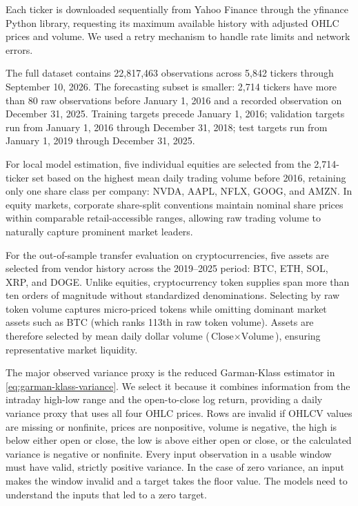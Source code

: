 \documentclass[12pt,a4paper]{article}
\numberwithin{equation}{section}
\numberwithin{table}{section}
\numberwithin{figure}{section}
\begin{document}
Each ticker is downloaded sequentially from Yahoo Finance through the yfinance Python library, requesting its maximum available history with adjusted OHLC prices and volume. We used a retry mechanism to handle rate limits and network errors. 

The full dataset contains 22,817,463 observations across 5,842 tickers through September 10, 2026. The forecasting subset is smaller: 2,714 tickers have more than 80 raw observations before January 1, 2016 and a recorded observation on December 31, 2025. Training targets precede January 1, 2016; validation targets run from January 1, 2016 through December 31, 2018; test targets run from January 1, 2019 through December 31, 2025. 

For local model estimation, five individual equities are selected from the 2,714-ticker set based on the highest mean daily trading volume before 2016, retaining only one share class per company: NVDA, AAPL, NFLX, GOOG, and AMZN. In equity markets, corporate share-split conventions maintain nominal share prices within comparable retail-accessible ranges, allowing raw trading volume to naturally capture prominent market leaders.

For the out-of-sample transfer evaluation on cryptocurrencies, five assets are selected from vendor history across the 2019--2025 period: BTC, ETH, SOL, XRP, and DOGE. Unlike equities, cryptocurrency token supplies span more than ten orders of magnitude without standardized denominations. Selecting by raw token volume captures micro-priced tokens while omitting dominant market assets such as BTC (which ranks 113th in raw token volume). Assets are therefore selected by mean daily dollar volume ($\text{Close}\times\text{Volume}$), ensuring representative market liquidity. 

The major observed variance proxy is the reduced Garman-Klass estimator in \eqref{eq:garman-klass-variance}. We select it because it combines information from the intraday high-low range and the open-to-close log return, providing a daily variance proxy that uses all four OHLC prices. Rows are invalid if OHLCV values are missing or nonfinite, prices are nonpositive, volume is negative, the high is below either open or close, the low is above either open or close, or the calculated variance is negative or nonfinite. Every input observation in a usable window must have valid, strictly positive variance. In the case of zero variance, an input makes the window invalid and a target takes the floor value. The models need to understand the inputs that led to a zero target.
\end{document}
